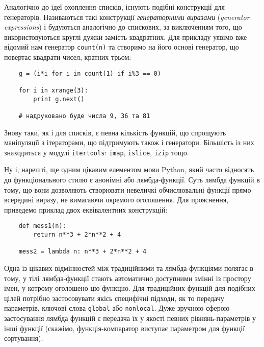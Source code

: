 \documentclass[a4paper, 12pt, onsedie]{article}
\begin{document}
    Аналогічно до ідеї охоплення списків, існують подібні конструкції для
    генераторів. Називаються такі конструкції \emph{генераторними виразами} 
    (\emph{generator expressions}) і будуються аналогічно до спискових, за
    виключенням того, що використовуються круглі дужки замість квадратних.
    Для прикладу уявімо вже відомий нам генератор \texttt{count(n)} та 
    створимо на його основі генератор, що повертає квадрати чисел, кратних
    трьом:
    \begin{verbatim}
    g = (i*i for i in count(1) if i%3 == 0)

    for i in xrange(3): 
        print g.next()

    # надруковано буде числа 9, 36 та 81
    \end{verbatim}

    Знову таки, як і для списків, є певна кількість функцій, що спрощують
    маніпуляції з ітераторами, що підтримують також і генератори. 
    Більшість із них знаходиться у модулі \texttt{itertools}:
    \texttt{imap}, \texttt{islice}, \texttt{izip} тощо.

    Ну і, нарешті, ще одним цікавим елементом мови Python, який часто відносять до 
    функціонального стилю є анонімні або лямбда-функції. Суть лямбда функцій в тому,
    що вони дозволяють створювати невеличкі обчислювальні функції прямо всередині виразу,
    не вимагаючи окремого оголошення. Для прояснення, приведемо приклад двох еквівалентних
    конструкцій:
    \begin{verbatim}
    def mess1(n):
        return n**3 + 2*n**2 + 4
    
    mess2 = lambda n: n**3 + 2*n**2 + 4
    \end{verbatim}
    Одна із цікавих відмінностей між традиційними та лямбда-функціями полягає в тому, у тілі
    лямбда-функції стають автоматично доступними змінні із простору імен, у котрому оголошено
    цю функцію. Для традиційних функцій для подібних цілей потрібно застосовувати якісь
    специфічні підходи, як то передачу параметрів, ключові слова \texttt{global} або 
    \texttt{nonlocal}. Дуже зручною сферою застосування лямбда функцій є передача їх у якості
    певних рівнянь-параметрів у інші функції (скажімо, функція-компаратор виступає параметром
    для функції сортування).
\end{document}
